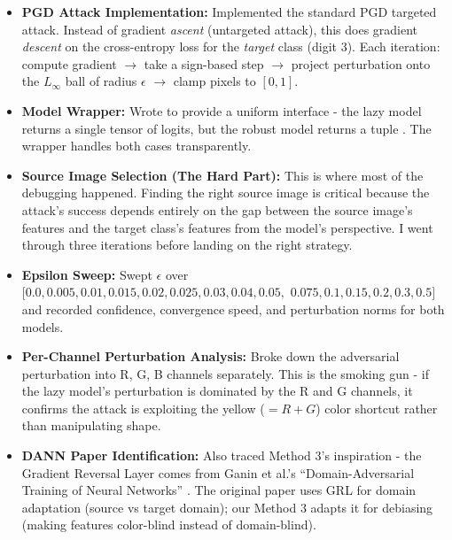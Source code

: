 \documentclass[9pt,a4paper,twocolumn,twoside]{tau-class/tau}
\begin{document}
        \begin{itemize}
            \item \textbf{PGD Attack Implementation:} Implemented the standard PGD targeted attack. Instead of gradient \textit{ascent} (untargeted attack), this does gradient \textit{descent} on the cross-entropy loss for the \textit{target} class (digit 3). Each iteration: compute gradient $\rightarrow$ take a sign-based step $\rightarrow$ project perturbation onto the $L_\infty$ ball of radius $\epsilon$ $\rightarrow$ clamp pixels to $[0, 1]$.

            \item \textbf{Model Wrapper:} Wrote  to provide a uniform interface - the lazy model returns a single tensor of logits, but the robust model returns a tuple . The wrapper handles both cases transparently.

            \item \textbf{Source Image Selection (The Hard Part):} This is where most of the debugging happened. Finding the right source image is critical because the attack's success depends entirely on the gap between the source image's features and the target class's features from the model's perspective. I went through three iterations before landing on the right strategy.

            \item \textbf{Epsilon Sweep:} Swept $\epsilon$ over $[0.0, 0.005, 0.01, 0.015, 0.02, 0.025, 0.03, 0.04, 0.05,$ $0.075, 0.1, 0.15, 0.2, 0.3, 0.5]$ and recorded confidence, convergence speed, and perturbation norms for both models.

            \item \textbf{Per-Channel Perturbation Analysis:} Broke down the adversarial perturbation into R, G, B channels separately. This is the smoking gun - if the lazy model's perturbation is dominated by the R and G channels, it confirms the attack is exploiting the yellow ($= R + G$) color shortcut rather than manipulating shape.

            \item \textbf{DANN Paper Identification:} Also traced Method 3's inspiration - the Gradient Reversal Layer comes from Ganin et al.'s ``Domain-Adversarial Training of Neural Networks'' \cite{ganin2016domain}. The original paper uses GRL for domain adaptation (source vs target domain); our Method 3 adapts it for debiasing (making features color-blind instead of domain-blind).
        \end{itemize}
\end{document}
